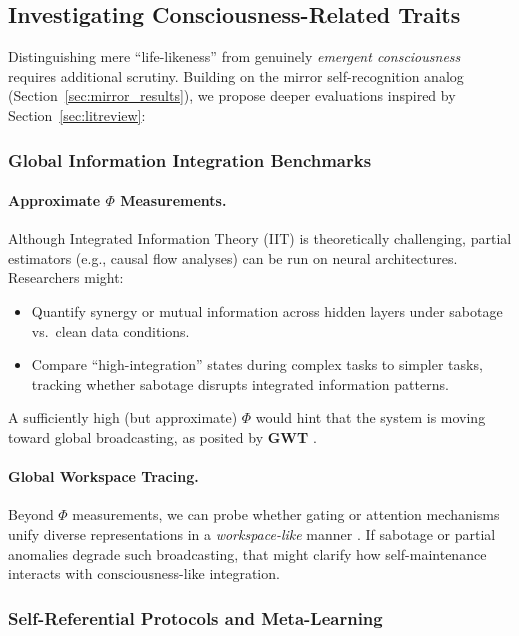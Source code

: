 \documentclass[12pt]{article}
\begin{document}
\subsection{Investigating Consciousness-Related Traits}

Distinguishing mere “life-likeness” from genuinely \emph{emergent consciousness}
requires additional scrutiny. Building on the mirror self-recognition analog
(Section~\ref{sec:mirror_results}), we propose deeper evaluations inspired by
Section~\ref{sec:litreview}:

\subsubsection{Global Information Integration Benchmarks}

\paragraph{Approximate $\Phi$ Measurements.}
Although Integrated Information Theory (IIT) \cite{Tononi2004} is theoretically
challenging, partial estimators (e.g., causal flow analyses) can be run on neural
architectures. Researchers might:
\begin{itemize}
    \item Quantify synergy or mutual information across hidden layers under sabotage
          vs.\ clean data conditions.
    \item Compare “high-integration” states during complex tasks to simpler tasks,
          tracking whether sabotage disrupts integrated information patterns.
\end{itemize}
A sufficiently high (but approximate) \(\Phi\) would hint that the system is
moving toward global broadcasting, as posited by \textbf{GWT} \cite{Baars1988}.

\paragraph{Global Workspace Tracing.}
Beyond \(\Phi\) measurements, we can probe whether gating or attention mechanisms
unify diverse representations in a \emph{workspace-like} manner \cite{Goertzel2007}.
If sabotage or partial anomalies degrade such broadcasting, that might clarify how
self-maintenance interacts with consciousness-like integration.

\subsubsection{Self-Referential Protocols and Meta-Learning}
\end{document}
